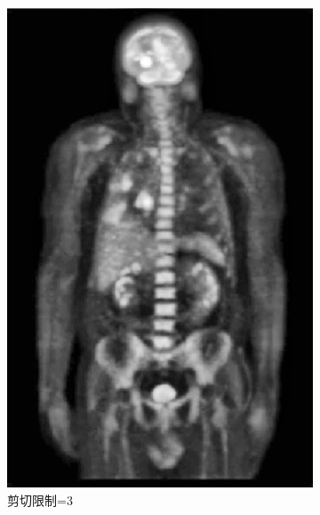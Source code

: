 \documentclass[a4paper]{ctexart}
\newcommand{\outwfour}{0.23\textwidth}
\begin{document}
\begin{spacing}{1.35}
\begin{figure}[htbp]
\begin{subfigure}[t]{\outwfour}
			\includegraphics[width=\textwidth]{figure/2_clip_limit_3.png}
			\caption{剪切限制=3}
		\end{subfigure}
		\begin{subfigure}[t]{\outwfour}
			\centering

\end{subfigure}
\end{figure}
\end{spacing}
\end{document}
